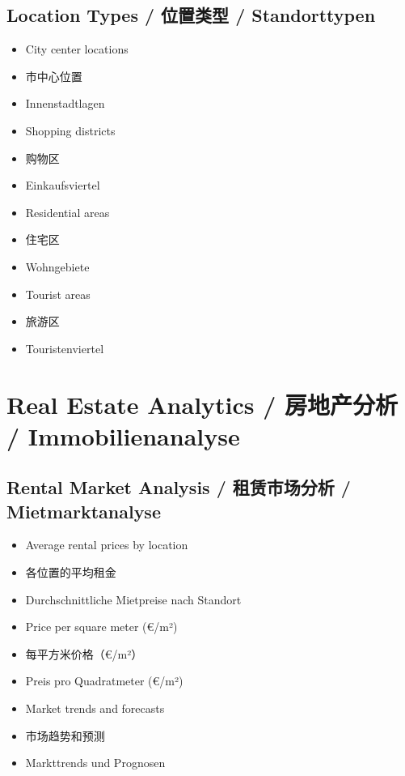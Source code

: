 \subsection{Location Types / 位置类型 / Standorttypen}
\begin{itemize}
    \item City center locations
    \item 市中心位置
    \item Innenstadtlagen
    \item Shopping districts
    \item 购物区
    \item Einkaufsviertel
    \item Residential areas
    \item 住宅区
    \item Wohngebiete
    \item Tourist areas
    \item 旅游区
    \item Touristenviertel
\end{itemize}

\section{Real Estate Analytics / 房地产分析 / Immobilienanalyse}

\subsection{Rental Market Analysis / 租赁市场分析 / Mietmarktanalyse}
\begin{itemize}
    \item Average rental prices by location
    \item 各位置的平均租金
    \item Durchschnittliche Mietpreise nach Standort
    \item Price per square meter (€/m²)
    \item 每平方米价格（€/m²）
    \item Preis pro Quadratmeter (€/m²)
    \item Market trends and forecasts
    \item 市场趋势和预测
    \item Markttrends und Prognosen
\end{itemize}

